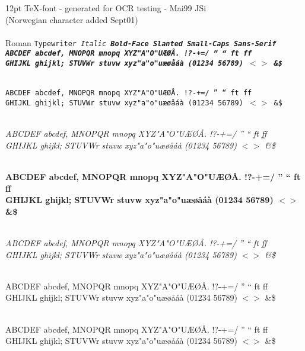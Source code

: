 \documentclass[12pt]{article}
\begin{document}
\def\f{
 \\ ABCDEF abcdef, MNOPQR mnopq XYZ"A"O"U{\AE}{\O}{\AA}. !?-+=/ '' `` ft ff
 \\ GHIJKL ghijkl; STUVWr stuvw xyz"a"o"u{\ae}{\o}{\aa}\'a\`a \3 (01234 56789) $<>$ \&\$
}
12pt TeX-font - generated for OCR testing - Mai99 JSi\\
(Norwegian character added Sept01)\\
\\ \rm Roman \tt Typewriter \it Italic \bf Bold-Face
   \sl Slanted \sc Small-Caps \sf Sans-Serif
\rm \f
\tt \f
\it \f
\bf \f
\sl \f
\sc \f
\sf \f
\end{document}
